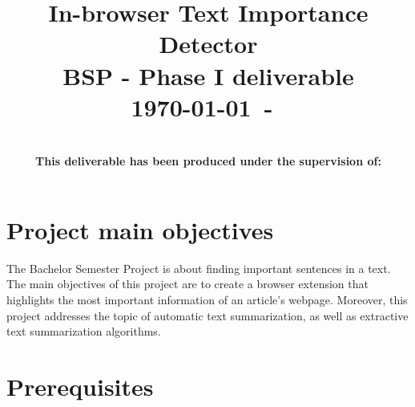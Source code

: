 \documentclass[conference,compsoc]{IEEEtran}
\begin{document}
\title{In-browser Text Importance Detector\\
BSP - Phase I deliverable\\
{\small \today~-~\currenttime}}


\author{
\\
{\bf This deliverable has been produced under the supervision of:}\\
%
}

\maketitle





%
\IEEEpeerreviewmaketitle



\section{Project main objectives}

The Bachelor Semester Project is about finding important sentences in a text. The main objectives of this project are to create a browser extension that highlights the most important information of an article's webpage. Moreover, this project  addresses the topic of automatic text summarization, as well as extractive text summarization algorithms.

\section{Prerequisites}
\end{document}
